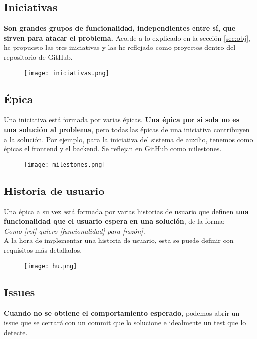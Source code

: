 \subsection{Iniciativas}\label{sec:inc}
\textbf{Son grandes grupos de funcionalidad, independientes entre sí, que sirven para atacar el problema.}
Acorde a lo explicado en la sección \ref{sec:obj}, he propuesto las tres iniciativas y las he 
reflejado como proyectos dentro del repositorio de GitHub.
\begin{figure}[H]
\centering	
\texttt{[image: iniciativas.png]}
\end{figure}

\subsection{Épica}
Una iniciativa está formada por varias épicas. \textbf{Una épica por si sola no es una solución al problema}, pero todas las épicas de una iniciativa contribuyen a la solución.
Por ejemplo, para la iniciativa del sistema de auxilio, tenemos 
como épicas el frontend y el backend. Se reflejan en GitHub como milestones.
\begin{figure}[H]
	\centering
\texttt{[image: milestones.png]}
\end{figure}


\subsection{Historia de usuario}\label{subsec:hu}
Una épica a su vez está formada por varias historias de usuario que definen \textbf{una funcionalidad que el usuario espera en una solución}, de la forma:\\ \textit{Como [rol] quiero [funcionalidad] para [razón].}\\

A la hora de implementar una historia de usuario, esta se puede definir con requisitos más detallados.

\begin{figure}[H]
	\centering	
	\texttt{[image: hu.png]}
	\end{figure}

\subsection{Issues}\label{subsec:issue}
\textbf{Cuando no se obtiene el comportamiento esperado}, podemos abrir un issue que se cerrará con un commit que lo solucione e idealmente un test que lo detecte.

